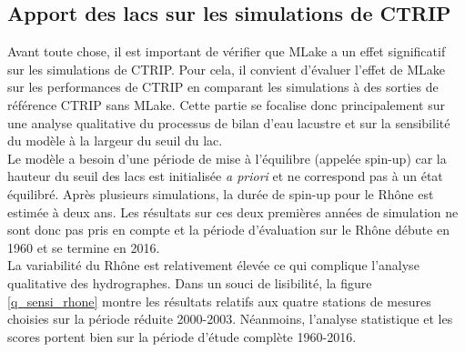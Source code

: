 \subsection{{\selectfont Apport des lacs sur les simulations de CTRIP}}
\label{subsec:apport}
Avant toute chose, il est important de vérifier que MLake a un effet significatif sur les simulations de CTRIP. Pour cela, il convient d'évaluer l'effet de MLake sur les performances de CTRIP en comparant les simulations à des sorties de référence CTRIP sans MLake. Cette partie se focalise donc principalement sur une analyse qualitative du processus de bilan d'eau lacustre et sur la sensibilité du modèle à la largeur du seuil du lac.\\

\noindent Le modèle a besoin d'une période de mise à l'équilibre (appelée spin-up) car la hauteur du seuil des lacs est initialisée \textit{a priori} et ne correspond pas à un état équilibré. Après plusieurs simulations, la durée de spin-up pour le Rhône est estimée à deux ans. Les résultats sur ces deux premières années de simulation ne sont donc pas pris en compte et la période d'évaluation sur le Rhône débute en 1960 et se termine en 2016.\\

\noindent La variabilité du Rhône est relativement élevée ce qui complique l'analyse qualitative des hydrographes. Dans un souci de lisibilité, la figure \ref{q_sensi_rhone} montre les résultats relatifs aux quatre stations de mesures choisies sur la période réduite 2000-2003. Néanmoins, l'analyse statistique et les scores portent bien sur la période d'étude complète 1960-2016.\\

